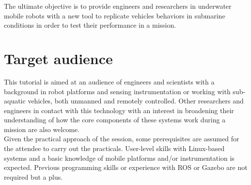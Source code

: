 \documentclass[
10pt, %
a4paper, %
oneside, %
BCOR5mm, %
]{scrartcl}
\begin{document}
The ultimate objective is to provide engineers and researchers in underwater mobile robots with a new tool to replicate vehicles behaviors in submarine conditions in order to test their performance in a mission. 
\\


\section{Target audience}
\label{sec:audience}
This tutorial is aimed at an audience of engineers and scientists with a background in robot platforms and sensing instrumentation or working with sub-aquatic vehicles, both unmanned and remotely controlled.
Other researchers and engineers in contact with this technology with an interest in broadening their understanding of how the core components of these systems work during a mission are also welcome.
\\
Given the practical approach of the session, some prerequisites are assumed for the attendee to carry out the practicals.
User-level skills with Linux-based systems and a basic knowledge of mobile platforms and/or instrumentation is expected.
Previous programming skills or experience with ROS or Gazebo are not required but a plus.

\end{document}
